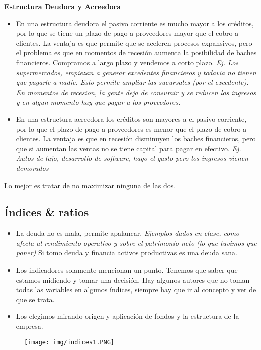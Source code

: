 \documentclass[titlepage,a4paper]{article}
\begin{document}
\medskip
\textbf{Estructura Deudora y Acreedora}
\medskip
\begin{itemize}
    \item En una estructura deudora el pasivo corriente es mucho mayor a los créditos, por lo que se tiene un plazo de pago a proveedores mayor que el cobro a clientes. La ventaja es que permite que se aceleren procesos expansivos, pero el problema es que en momentos de recesión aumenta la posibilidad de baches financieros. Compramos a largo plazo y vendemos a corto plazo. \textit{Ej. Los supermercados, empiezan a generar excedentes financieros y todavia no tienen que pagarle a nadie. Esto permite ampliar las sucursales (por el excedente). En momentos de recesion, la gente deja de consumir y se reducen los ingresos y en algun momento hay que pagar a los proveedores.} 
    \item En una estructura acreedora los créditos son mayores a el pasivo corriente, por lo que el plazo de pago a proveedores es menor que el plazo de cobro a clientes. La ventaja es que en recesión disminuyen los baches financieros, pero que si aumentan las ventas no se tiene capital para pagar en efectivo. \textit{Ej. Autos de lujo, desarrollo de software, hago el gasto pero los ingresos vienen demorados}
\end{itemize}

Lo mejor es tratar de no maximizar ninguna de las dos.

\subsection{Índices \& ratios }


\begin{itemize}
\item La deuda no es mala, permite apalancar. \textit{Ejemplos dados en clase, como afecta al rendimiento operativo y sobre el patrimonio neto (lo que tuvimos que poner) } Si tomo deuda y financia activos productivas es una deuda sana.
\item Los indicadores solamente mencionan un punto. Tenemos que saber que estamos midiendo y tomar una decisión. Hay algunos autores que no toman todas las variables en algunos índices, siempre hay que ir al concepto y ver de que se trata.
\item Los elegimos mirando origen y aplicación de fondos y la estructura de la empresa.
\end{itemize}



\begin{figure}[!htb]
    \centering
    \texttt{[image: img/indices1.PNG]}
\end{figure}
\end{document}
